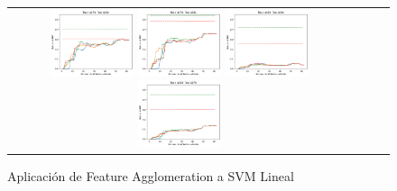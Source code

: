 \begin{figure}[h!]
\begin{tabular}{cccc}
\includegraphics[width=0.25\textwidth]{Kap5/linear_ALL_LINKAGES_train=b278test=b234.png}  \includegraphics[width=0.25\textwidth]{Kap5/linear_ALL_LINKAGES_train=b278test=b261.png} 
 \includegraphics[width=0.25\textwidth]{Kap5/linear_ALL_LINKAGES_train=b360test=b234.png}  \includegraphics[width=0.25\textwidth]{Kap5/linear_ALL_LINKAGES_train=b360test=b278.png} 
\end{tabular}
\caption{Aplicación de Feature Agglomeration a SVM Lineal}
\label{fig:agg_l}
\end{figure}

